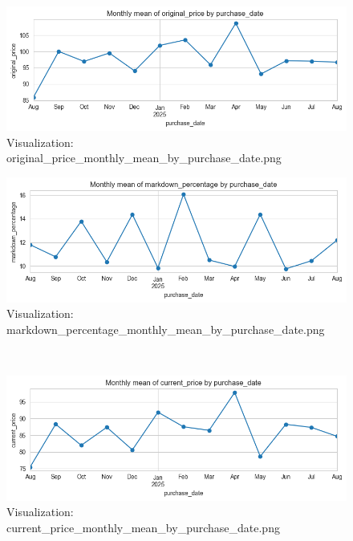 \documentclass{article}%
\begin{document}
\vspace{10pt}%
\\%
\begin{minipage}[c]{0.48\textwidth}%


\begin{figure}[H]%
\centering%
\includegraphics[width=\linewidth]{output/plots/original_price_monthly_mean_by_purchase_date.png}%
\caption{Visualization: original\_price\_monthly\_mean\_by\_purchase\_date.png}%
\end{figure}

%
\end{minipage}%
\begin{minipage}[c]{0.48\textwidth}%


\begin{figure}[H]%
\centering%
\includegraphics[width=\linewidth]{output/plots/markdown_percentage_monthly_mean_by_purchase_date.png}%
\caption{Visualization: markdown\_percentage\_monthly\_mean\_by\_purchase\_date.png}%
\end{figure}

%
\end{minipage}%
\vspace{10pt}%
\\%
\begin{minipage}[c]{0.48\textwidth}%


\begin{figure}[H]%
\centering%
\includegraphics[width=\linewidth]{output/plots/current_price_monthly_mean_by_purchase_date.png}%
\caption{Visualization: current\_price\_monthly\_mean\_by\_purchase\_date.png}%
\end{figure}

%
\end{minipage}%
\end{document}
